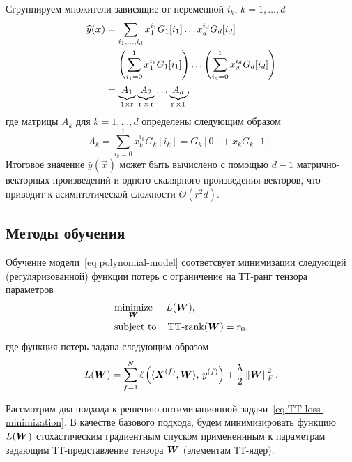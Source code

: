 Сгруппируем множители зависящие от переменной $i_k$, $k=1, \ldots, d$
\begin{equation*}
\begin{aligned}
\widehat{y}(\boldsymbol{x}) &= \sum_{i_1, \ldots, i_d}  x_1^{i_1} G_1[i_1] \ldots x_d^{i_d} G_d[i_d]\\
&= \left ( \sum_{i_1=0}^1 x_1^{i_1} G_1[i_1] \right ) \ldots \left ( \sum_{i_d=0}^1 x_d^{i_d} G_d[i_d] \right )\\
&= \underbrace{A_1}_{1 \times \operatorname{r}} \underbrace{A_2}_{\operatorname{r} \times \operatorname{r}} \ldots \underbrace{A_d}_{\operatorname{r} \times 1},
\end{aligned}
\end{equation*}
где матрицы $A_k$ для $k=1, \ldots, d$ определены следующим образом
\begin{equation*}
A_k = \sum_{i_k=0}^1 x_k^{i_k} G_k[i_k] = G_k[0] + x_k G_k[1].
\end{equation*}
Итоговое значение $\widehat{y}(\vec{x})$ может быть вычислено с помощью $d-1$ матрично-векторных произведений и одного скалярного произведения векторов, что приводит к асимптотической сложности $O(r^2 d)$.

\subsection{Методы обучения}
Обучение модели~\eqref{eq:polynomial-model} соответсвует минимизации следующей (регуляризованной) функции потерь с ограничение на ТТ-ранг тензора параметров
\begin{equation}
\label{eq:TT-loss-minimization}
\begin{aligned}
& \underset{\boldsymbol{W}}{\text{minimize}}
& & L(\boldsymbol{W}), \\
& \text{subject to}
& & \operatorname{TT-rank}(\boldsymbol{W}) = r_0,
\end{aligned}
\end{equation}
где функция потерь задана следующим образом
\begin{equation}
\label{eq:TT-loss}
L(\boldsymbol{W}) = \sum_{f=1}^N \ell\left(\langle \boldsymbol{X}^{(f)}, \boldsymbol{W} \rangle,\, y^{(f)}\right) + \frac{\uplambda}{2} \left\lVert\boldsymbol{W}\right\rVert^2_F.
\end{equation}

Рассмотрим два подхода к решению оптимизационной задачи~\eqref{eq:TT-loss-minimization}.
В качестве базового подхода, будем минимизировать функцию $L(\boldsymbol{W})$ стохастическим градиентным спуском примененнным к параметрам задающим ТТ-представление тензора $\boldsymbol{W}$ (элементам ТТ-ядер).

